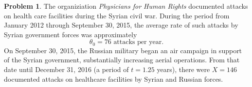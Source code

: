 \documentclass[10pt]{amsart}
\theoremstyle{definition}
\newtheorem{problem}[theorem]{Problem}
\newcommand{\1}[1]{\textbf{1}_{\left[#1\right]}} %
\begin{document}
\begin{problem}
  The organiziation \textit{Physicians for Human Rights} documented attacks on
  health care facilities during the Syrian civil war. During the period from
  January 2012 through September 30, 2015, the average rate of such attacks by
  Syrian government forces was approximately
  \begin{equation*}
    \theta_0 = 76 \text{ attacks per year}.
  \end{equation*}
  On September 30, 2015, the Russian military began an air campaign in support
  of the Syrian government, substantially increasing aerial operations. From
  that date until December 31, 2016 (a period of $t=1.25$ years), there were
  $X=146$ documented attacks on healthcare facilities by Syrian and Russian
  forces.

  \begin{enumerate}[(a)]
    \setlength{\itemsep}{1em}


\end{enumerate}
\end{problem}
\end{document}
